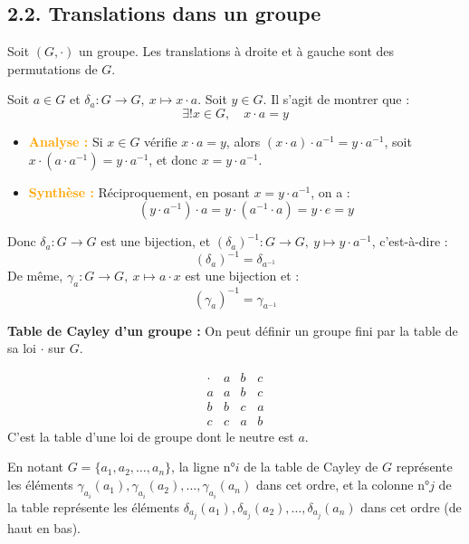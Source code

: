 \documentclass[a4paper,11pt]{article}
\newcommand{\cas}[1]{\textbf{\textcolor{orange}{#1}}}
\begin{document}
\newpage
\subsection{2.2. Translations dans un groupe}

\begin{proposition}
Soit $(G, \cdot)$ un groupe. Les translations à droite et à gauche sont des permutations de $G$.
\end{proposition}

\begin{demonstration}
Soit $a \in G$ et $\delta_a : G \to G, \ x \mapsto x \cdot a$.
Soit $y \in G$. Il s'agit de montrer que :
\[
\exists! x \in G, \quad x \cdot a = y
\]
\begin{itemize}
    \item \cas{Analyse :} Si $x \in G$ vérifie $x \cdot a = y$, alors $(x \cdot a) \cdot a^{-1} = y \cdot a^{-1}$, soit $x \cdot (a \cdot a^{-1}) = y \cdot a^{-1}$, et donc $x = y \cdot a^{-1}$.
    \item \cas{Synthèse :} Réciproquement, en posant $x = y \cdot a^{-1}$, on a :
    \[
    (y \cdot a^{-1}) \cdot a = y \cdot (a^{-1} \cdot a) = y \cdot e = y
    \]
\end{itemize}
Donc $\delta_a : G \to G$ est une bijection, et $(\delta_a)^{-1} : G \to G, \ y \mapsto y \cdot a^{-1}$, c'est-à-dire :
\[
(\delta_a)^{-1} = \delta_{a^{-1}}
\]
De même, $\gamma_a : G \to G, \ x \mapsto a \cdot x$ est une bijection et :
\[
(\gamma_a)^{-1} = \gamma_{a^{-1}}
\]
\end{demonstration}

\textbf{Table de Cayley d'un groupe :}
On peut définir un groupe fini par la table de sa loi $\cdot$ sur $G$.

\begin{exemples}
\[
\begin{array}{c|ccc}
\cdot & a & b & c \\
\hline
a & a & b & c \\
b & b & c & a \\
c & c & a & b
\end{array}
\]
C'est la table d'une loi de groupe dont le neutre est $a$.
\end{exemples}

En notant $G = \{a_1, a_2, \dots, a_n\}$, la ligne n°$i$ de la table de Cayley de $G$ représente les éléments $\gamma_{a_i}(a_1), \gamma_{a_i}(a_2), \dots, \gamma_{a_i}(a_n)$ dans cet ordre, et la colonne n°$j$ de la table représente les éléments $\delta_{a_j}(a_1), \delta_{a_j}(a_2), \dots, \delta_{a_j}(a_n)$ dans cet ordre (de haut en bas).
\end{document}
